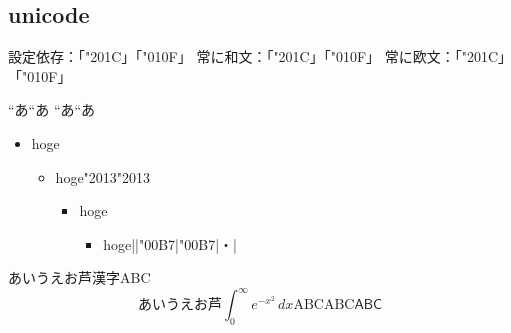 \documentclass{article}
\begin{document}
\subsection{unicode}

設定依存：「\char"201C」「\char"010F」%
常に和文：「\ltjjachar"201C」「\ltjjachar"010F」%
常に欧文：「\ltjalchar"201C」「\ltjalchar"010F」%

{\tracingall\let\char=\ltjalchar\textquotedblleft}あ\textquotedblleft あ%
{\let\char=\ltjjachar\textquotedblleft}あ“あ

\begin{itemize}
\item hoge
\begin{itemize}
\item hoge\textendash\ltjjachar"2013\ltjalchar"2013
\begin{itemize}
\item hoge
\begin{itemize}
\item hoge|\textperiodcentered|\ltjjachar"00B7|\ltjalchar"00B7|・|
\end{itemize}
\end{itemize}
\end{itemize}
\end{itemize}

あいうえお芦漢字ABC
\[
あいうえお芦\int_0^∞ e^{-x^2}\,dx\mathrm{ABC}\textrm{ABC}\textsf{ABC}
\]
\end{document}
